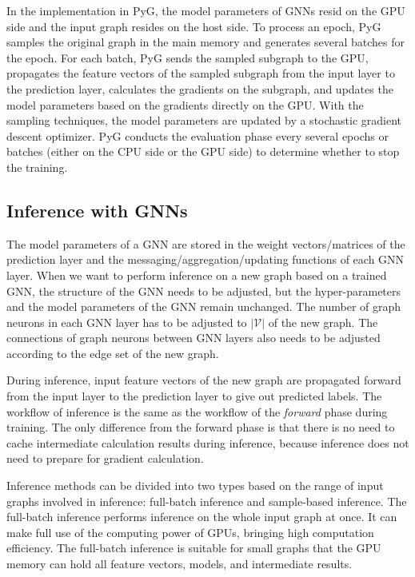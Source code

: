 In the implementation in PyG, the model parameters of GNNs resid on the GPU side and the input graph resides on the host side.
%
To process an epoch, PyG samples the original graph in the main memory and generates several batches for the epoch.
%
For each batch, PyG sends the sampled subgraph to the GPU, propagates the feature vectors of the sampled subgraph from the input layer to the prediction layer, calculates the gradients on the subgraph, and updates the model parameters based on the gradients directly on the GPU.
%
With the sampling techniques, the model parameters are updated by a stochastic gradient descent optimizer.
%
PyG conducts the evaluation phase every several epochs or batches (either on the CPU side or the GPU side) to determine whether to stop the training.


\subsection{Inference with GNNs}

The model parameters of a GNN are stored in the weight vectors/matrices of the prediction layer and the messaging/aggregation/updating functions of each GNN layer.
%
When we want to perform inference on a new graph based on a trained GNN, the structure of the GNN needs to be adjusted, but the hyper-parameters and the model parameters of the GNN remain unchanged.
%
The number of graph neurons in each GNN layer has to be adjusted to $|\mathcal{V}|$ of the new graph.
%
The connections of graph neurons between GNN layers also needs to be adjusted according to the edge set of the new graph.

During inference, input feature vectors of the new graph are propagated forward from the input layer to the prediction layer to give out predicted labels.
%
The workflow of inference is the same as the workflow of the \emph{forward} phase during training.
%
The only difference from the forward phase is that there is no need to cache intermediate calculation results during inference, because inference does not need to prepare for gradient calculation.

Inference methods can be divided into two types based on the range of input graphs involved in inference: full-batch inference and sample-based inference.
%
The full-batch inference performs inference on the whole input graph at once.
%
It can make full use of the computing power of GPUs, bringing high computation efficiency.
%
The full-batch inference is suitable for small graphs that the GPU memory can hold all feature vectors, models, and intermediate results.

